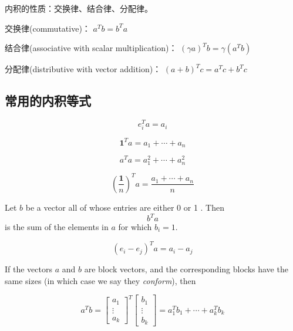 \begin{theorem}
    内积的性质：交换律、结合律、分配律。 

交换律(commutative)： \( a^{T} b=b^{T} a \)

结合律(associative with scalar multiplication)： \( (\gamma a)^{T} b=\gamma\left(a^{T} b\right) \)

分配律(distributive with vector addition)： \( (a+b)^{T} c=a^{T} c+b^{T} c \)
\end{theorem}


\subsection{常用的内积等式}
\begin{corollary}[选出第$i$项]
    $$ e_{i}^{T} a=a_{i} $$
\end{corollary}

\begin{corollary}[向量每一项之和]
    $$ \mathbf{1}^{T} a=a_{1}+\cdots+a_{n} $$
\end{corollary}

\begin{corollary}[向量每一项的平方和]
    $$ a^{T} a=a_{1}^{2}+\cdots+a_{n}^{2} $$
\end{corollary}

\begin{corollary}[向量元素的平均值]
    $$ (\frac{\mathbf{1}}{n})^{T} a= \frac{a_{1}+\cdots+a_{n}}{n}  $$
\end{corollary}

\begin{corollary}
    Let $ b $ be a vector all of whose entries are either 0 or 1 . Then $$ b^{T} a $$ is the sum of the elements in $ a $ for which $ b_{i}=1 $.
\end{corollary}

\begin{corollary}[Differencing]
    $$ \left(e_{i}-e_{j}\right)^{T} a=a_{i}-a_{j} $$
\end{corollary}

\begin{definition}
    If the vectors $ a $ and $ b $ are block vectors, and the corresponding blocks have the same sizes (in which case we say they \textit{conform}), then 

    $$ a^{T} b=\left[\begin{array}{c}a_{1} \\ \vdots \\ a_{k}\end{array}\right]^{T}\left[\begin{array}{c}b_{1} \\ \vdots \\ b_{k}\end{array}\right]=a_{1}^{T} b_{1}+\cdots+a_{k}^{T} b_{k} $$
\end{definition}


